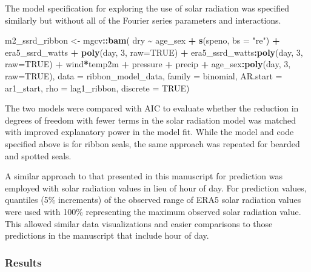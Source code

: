 \documentclass[fleqn,10pt,lineno]{wlpeerj} %
\newenvironment{Shaded}{\begin{snugshade}}{\end{snugshade}}
\newcommand{\AttributeTok}[1]{\textcolor[rgb]{0.13,0.29,0.53}{#1}}
\newcommand{\ConstantTok}[1]{\textcolor[rgb]{0.56,0.35,0.01}{#1}}
\newcommand{\DecValTok}[1]{\textcolor[rgb]{0.00,0.00,0.81}{#1}}
\newcommand{\FunctionTok}[1]{\textcolor[rgb]{0.13,0.29,0.53}{\textbf{#1}}}
\newcommand{\NormalTok}[1]{#1}
\newcommand{\OtherTok}[1]{\textcolor[rgb]{0.56,0.35,0.01}{#1}}
\newcommand{\SpecialCharTok}[1]{\textcolor[rgb]{0.81,0.36,0.00}{\textbf{#1}}}
\newcommand{\StringTok}[1]{\textcolor[rgb]{0.31,0.60,0.02}{#1}}
\begin{document}
The model specification for exploring the use of solar radiation was
specified similarly but without all of the Fourier series parameters and
interactions.

\begin{Shaded}
\begin{Highlighting}[]
\NormalTok{m2\_ssrd\_ribbon }\OtherTok{\textless{}{-}}\NormalTok{ mgcv}\SpecialCharTok{::}\FunctionTok{bam}\NormalTok{(}
\NormalTok{  dry }\SpecialCharTok{\textasciitilde{}}\NormalTok{ age\_sex }\SpecialCharTok{+} \FunctionTok{s}\NormalTok{(speno, }\AttributeTok{bs =} \StringTok{"re"}\NormalTok{) }\SpecialCharTok{+} 
\NormalTok{    era5\_ssrd\_watts }\SpecialCharTok{+}
    \FunctionTok{poly}\NormalTok{(day, }\DecValTok{3}\NormalTok{, }\AttributeTok{raw=}\ConstantTok{TRUE}\NormalTok{) }\SpecialCharTok{+} 
\NormalTok{    era5\_ssrd\_watts}\SpecialCharTok{:}\FunctionTok{poly}\NormalTok{(day, }\DecValTok{3}\NormalTok{, }\AttributeTok{raw=}\ConstantTok{TRUE}\NormalTok{) }\SpecialCharTok{+}
\NormalTok{    wind}\SpecialCharTok{*}\NormalTok{temp2m }\SpecialCharTok{+}\NormalTok{ pressure }\SpecialCharTok{+}\NormalTok{ precip }\SpecialCharTok{+} 
\NormalTok{    age\_sex}\SpecialCharTok{:}\FunctionTok{poly}\NormalTok{(day, }\DecValTok{3}\NormalTok{, }\AttributeTok{raw=}\ConstantTok{TRUE}\NormalTok{),}
  \AttributeTok{data =}\NormalTok{ ribbon\_model\_data,}
  \AttributeTok{family =}\NormalTok{ binomial,}
  \AttributeTok{AR.start =}\NormalTok{ ar1\_start,}
  \AttributeTok{rho =}\NormalTok{ lag1\_ribbon,}
  \AttributeTok{discrete =} \ConstantTok{TRUE}\NormalTok{)}
\end{Highlighting}
\end{Shaded}

The two models were compared with AIC to evaluate whether the
reduction in degrees of freedom with fewer terms in the solar radiation
model was matched with improved explanatory power in the model fit. While the
model and code specified above is for ribbon seals, the same approach was
repeated for bearded and spotted seals.

A similar approach to that presented in this manuscript for prediction was
employed with solar radiation values in lieu of hour of day. For prediction
values, quantiles (5\% increments) of the observed range of ERA5 solar radiation values were
used with 100\% representing the maximum observed solar radiation value. This
allowed similar data visualizations and easier comparisons to those
predictions in the manuscript that include hour of day.

\subsubsection{Results}\label{results-1}
\end{document}
